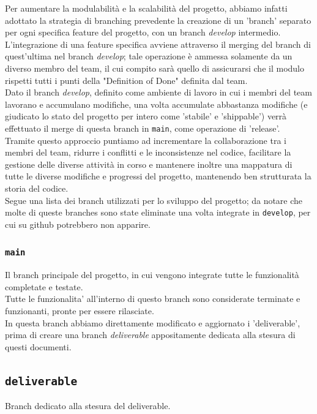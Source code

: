 \documentclass{article}
\begin{document}
\noindent
Per aumentare la modulabilità e la scalabilità del progetto, abbiamo infatti adottato la strategia di branching prevedente la creazione di un 'branch' separato per ogni specifica feature del progetto, con un branch \textit{develop} intermedio.\\

\noindent
L'integrazione di una feature specifica avviene attraverso il merging del branch di quest'ultima nel branch \textit{develop}; tale operazione è ammessa solamente da un diverso membro del team, il cui compito sarà quello di assicurarsi che il modulo rispetti tutti i punti della "Definition of Done" definita dal team. \\

\noindent
Dato il branch \textit{develop}, definito come ambiente di lavoro in cui i membri del team lavorano e accumulano modifiche, una volta accumulate abbastanza modifiche (e giudicato lo stato del progetto per intero come 'stabile' e 'shippable') verrà effettuato il merge di questa branch in \texttt{main}, come operazione di 'release'. \\

\noindent
Tramite questo approccio puntiamo ad incrementare la collaborazione tra i membri del team, ridurre i conflitti e le inconsistenze nel codice, facilitare la gestione delle diverse attività in corso e mantenere inoltre una mappatura di tutte le diverse modifiche e progressi del progetto, mantenendo ben strutturata la storia del codice.\\

Segue una lista dei branch utilizzati per lo sviluppo del progetto; da notare che molte di queste branches sono state eliminate una volta integrate in \texttt{develop}, per cui su github potrebbero non apparire.

\subsubsection{\texttt{main}}
Il branch principale del progetto, in cui vengono integrate tutte le funzionalità completate e testate.\\
Tutte le funzionalita' all'interno di questo branch sono considerate terminate e funzionanti, pronte per essere rilasciate.\\
In questa branch abbiamo direttamente modificato e aggiornato i 'deliverable', prima di creare una branch \textit{deliverable} appositamente dedicata alla stesura di questi documenti.

\subsection{\texttt{deliverable}}
Branch dedicato alla stesura del deliverable.
\end{document}
